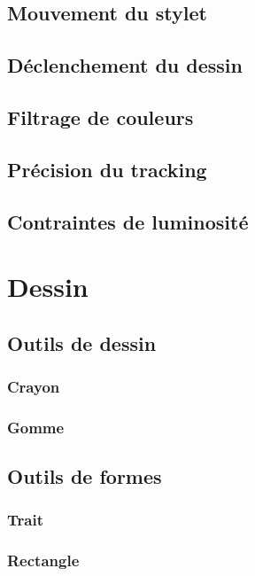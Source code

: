 \documentclass[11pt,a4paper,oldfontcommands]{memoir}
\begin{document}
\subsection{Mouvement du stylet}

\subsection{Déclenchement du dessin}

\subsection{Filtrage de couleurs}

\subsection{Précision du tracking}

\subsection{Contraintes de luminosité}

\newpage

\section{Dessin}

\subsection{Outils de dessin}

\subsubsection{Crayon}

\subsubsection{Gomme}

\subsection{Outils de formes}

\subsubsection{Trait}

\subsubsection{Rectangle}
\end{document}
